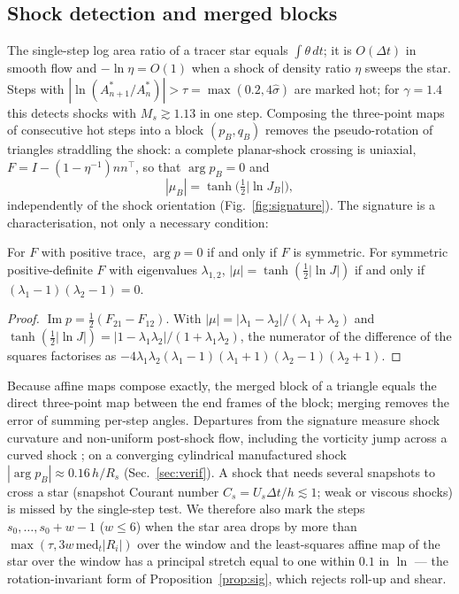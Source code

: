 \documentclass[11pt]{article}
\theoremstyle{definition}\newtheorem{definition}{Definition}\theoremstyle{remark}\newtheorem{remark}{Remark}
\newcommand{\im}{\operatorname{Im}}\newcommand{\re}{\operatorname{Re}}
\begin{document}
\subsection{Shock detection and merged blocks}\label{sec:shock}
The single-step log area ratio of a tracer star equals $\int\theta\,dt$; it is $O(\Delta t)$ in smooth flow and $-\ln\eta=O(1)$ when a shock of density ratio $\eta$ sweeps the star. Steps with $|\ln(A^\ast_{n+1}/A^\ast_n)|>\tau=\max(0.2,4\hat\sigma)$ are marked hot; for $\gamma=1.4$ this detects shocks with $M_s\gtrsim1.13$ in one step. Composing the three-point maps of consecutive hot steps into a block $(p_B,q_B)$ removes the pseudo-rotation of triangles straddling the shock: a complete planar-shock crossing is uniaxial, $F=I-(1-\eta^{-1})nn^\top$, so that $\arg p_B=0$ and
\begin{equation}
|\mu_B|=\tanh\big(\tfrac12|\ln J_B|\big),
\end{equation}
independently of the shock orientation (Fig.~\ref{fig:signature}). The signature is a characterisation, not only a necessary condition:
\begin{proposition}\label{prop:sig}
For $F$ with positive trace, $\arg p=0$ if and only if $F$ is symmetric. For symmetric positive-definite $F$ with eigenvalues $\lambda_{1,2}$, $|\mu|=\tanh(\frac12|\ln J|)$ if and only if $(\lambda_1-1)(\lambda_2-1)=0$.
\end{proposition}
\begin{proof}
$\im p=\frac12(F_{21}-F_{12})$. With $|\mu|=|\lambda_1-\lambda_2|/(\lambda_1+\lambda_2)$ and $\tanh(\frac12|\ln J|)=|1-\lambda_1\lambda_2|/(1+\lambda_1\lambda_2)$, the numerator of the difference of the squares factorises as $-4\lambda_1\lambda_2(\lambda_1-1)(\lambda_1+1)(\lambda_2-1)(\lambda_2+1)$.
\end{proof}
Because affine maps compose exactly, the merged block of a triangle equals the direct three-point map between the end frames of the block; merging removes the error of summing per-step angles. Departures from the signature measure shock curvature and non-uniform post-shock flow, including the vorticity jump across a curved shock \citep{Hayes1957}; on a converging cylindrical manufactured shock $|\arg p_B|\approx0.16\,h/R_s$ (Sec.~\ref{sec:verif}).
A shock that needs several snapshots to cross a star (snapshot Courant number $C_s=U_s\Delta t/h\lesssim1$; weak or viscous shocks) is missed by the single-step test. We therefore also mark the steps $s_0,\dots,s_0+w-1$ ($w\le6$) when the star area drops by more than $\max(\tau,3w\,\mathrm{med}_t|R_i|)$ over the window and the least-squares affine map of the star over the window has a principal stretch equal to one within $0.1$ in $\ln$ --- the rotation-invariant form of Proposition~\ref{prop:sig}, which rejects roll-up and shear.
\end{document}
